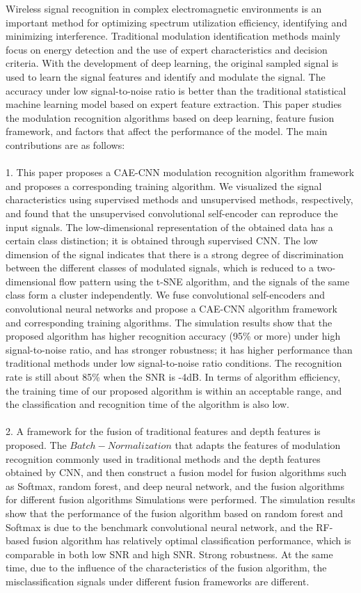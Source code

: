 \begin{englishabstract}
Wireless signal recognition in complex electromagnetic environments is an important method for optimizing spectrum utilization efficiency, identifying and minimizing interference. Traditional modulation identification methods mainly focus on energy detection and the use of expert characteristics and decision criteria. With the development of deep learning, the original sampled signal is used to learn the signal features and identify and modulate the signal. The accuracy under low signal-to-noise ratio is better than the traditional statistical machine learning model based on expert feature extraction. This paper studies the modulation recognition algorithms based on deep learning, feature fusion framework, and factors that affect the performance of the model. The main contributions are as follows:
\\~\\
1. This paper proposes a CAE-CNN modulation recognition algorithm framework and proposes a corresponding training algorithm. We visualized the signal characteristics using supervised methods and unsupervised methods, respectively, and found that the unsupervised convolutional self-encoder can reproduce the input signals. The low-dimensional representation of the obtained data has a certain class distinction; it is obtained through supervised CNN. The low dimension of the signal indicates that there is a strong degree of discrimination between the different classes of modulated signals, which is reduced to a two-dimensional flow pattern using the t-SNE algorithm, and the signals of the same class form a cluster independently. We fuse convolutional self-encoders and convolutional neural networks and propose a CAE-CNN algorithm framework and corresponding training algorithms. The simulation results show that the proposed algorithm has higher recognition accuracy (95\% or more) under high signal-to-noise ratio, and has stronger robustness; it has higher performance than traditional methods under low signal-to-noise ratio conditions. The recognition rate is still about 85\% when the SNR is -4dB. In terms of algorithm efficiency, the training time of our proposed algorithm is within an acceptable range, and the classification and recognition time of the algorithm is also low.
\\~\\
2. A framework for the fusion of traditional features and depth features is proposed. The $Batch-Normalization$ that adapts the features of modulation recognition commonly used in traditional methods and the depth features obtained by CNN, and then construct a fusion model for fusion algorithms such as Softmax, random forest, and deep neural network, and the fusion algorithms for different fusion algorithms Simulations were performed. The simulation results show that the performance of the fusion algorithm based on random forest and Softmax is due to the benchmark convolutional neural network, and the RF-based fusion algorithm has relatively optimal classification performance, which is comparable in both low SNR and high SNR. Strong robustness. At the same time, due to the influence of the characteristics of the fusion algorithm, the misclassification signals under different fusion frameworks are different.

\end{englishabstract}
